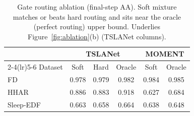 \begin{table}[t]
\centering
\caption{Gate routing ablation (final-step AA). Soft mixture matches or beats
hard routing and sits near the oracle (perfect routing) upper bound.
Underlies Figure~\ref{fig:ablation}(b) (TSLANet columns).}
\label{tab:gate}
\small
\begin{tabular}{l ccc cc}
\toprule
& \multicolumn{3}{c}{TSLANet} & \multicolumn{2}{c}{MOMENT}\\
\cmidrule(lr){2-4}\cmidrule(lr){5-6}
Dataset & Soft & Hard & Oracle & Soft & Oracle\\
\midrule
FD & 0.978 & 0.979 & 0.982 & 0.984 & 0.985\\
HHAR & 0.886 & 0.883 & 0.918 & 0.627 & 0.684\\
Sleep-EDF & 0.663 & 0.658 & 0.664 & 0.638 & 0.648\\
\bottomrule
\end{tabular}
\end{table}

